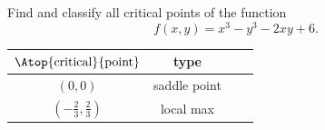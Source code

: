 \begin{question}[M200 2006D] %

\end{question}
Find and classify all critical points of the function
\begin{equation*}
f(x, y) = x^3 - y^3 - 2xy + 6.
\end{equation*}
%

\begin{answer}
\renewcommand{\arraystretch}{1.3}
     \begin{tabular}{|c|c|c|c|}
     \hline
    $\Atop{\text{critical}}{\text{point}}$ & type \\    
    \hline
     $(0,0)$ & saddle point  \\ \hline
     $\left(-\frac{2}{3},\frac{2}{3}\right)$ & local max \\  \hline
     \end{tabular}
\renewcommand{\arraystretch}{1.0}
\end{answer}

